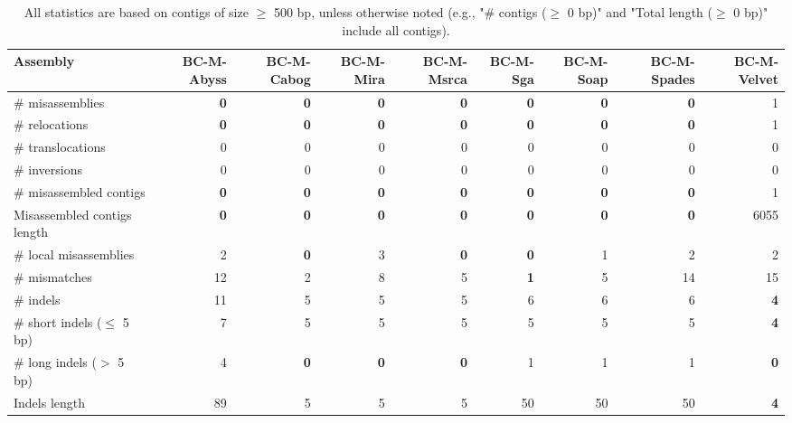 \documentclass[12pt,a4paper]{article}
\begin{document}
\begin{table}[ht]
\begin{center}
\caption{All statistics are based on contigs of size $\geq$ 500 bp, unless otherwise noted (e.g., "\# contigs ($\geq$ 0 bp)" and "Total length ($\geq$ 0 bp)" include all contigs).}
\begin{tabular}{|l*{8}{|r}|}
\hline
Assembly & BC-M-Abyss & BC-M-Cabog & BC-M-Mira & BC-M-Msrca & BC-M-Sga & BC-M-Soap & BC-M-Spades & BC-M-Velvet \\ \hline
\# misassemblies & {\bf 0} & {\bf 0} & {\bf 0} & {\bf 0} & {\bf 0} & {\bf 0} & {\bf 0} & 1 \\ \hline
\hspace{5mm}\# relocations & {\bf 0} & {\bf 0} & {\bf 0} & {\bf 0} & {\bf 0} & {\bf 0} & {\bf 0} & 1 \\ \hline
\hspace{5mm}\# translocations & 0 & 0 & 0 & 0 & 0 & 0 & 0 & 0 \\ \hline
\hspace{5mm}\# inversions & 0 & 0 & 0 & 0 & 0 & 0 & 0 & 0 \\ \hline
\# misassembled contigs & {\bf 0} & {\bf 0} & {\bf 0} & {\bf 0} & {\bf 0} & {\bf 0} & {\bf 0} & 1 \\ \hline
Misassembled contigs length & {\bf 0} & {\bf 0} & {\bf 0} & {\bf 0} & {\bf 0} & {\bf 0} & {\bf 0} & 6055 \\ \hline
\# local misassemblies & 2 & {\bf 0} & 3 & {\bf 0} & {\bf 0} & 1 & 2 & 2 \\ \hline
\# mismatches & 12 & 2 & 8 & 5 & {\bf 1} & 5 & 14 & 15 \\ \hline
\# indels & 11 & 5 & 5 & 5 & 6 & 6 & 6 & {\bf 4} \\ \hline
\hspace{5mm}\# short indels ($\leq$ 5 bp) & 7 & 5 & 5 & 5 & 5 & 5 & 5 & {\bf 4} \\ \hline
\hspace{5mm}\# long indels ($>$ 5 bp) & 4 & {\bf 0} & {\bf 0} & {\bf 0} & 1 & 1 & 1 & {\bf 0} \\ \hline
Indels length & 89 & 5 & 5 & 5 & 50 & 50 & 50 & {\bf 4} \\ \hline
\end{tabular}
\end{center}
\end{table}
\end{document}

